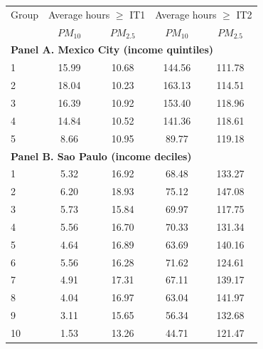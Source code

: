 \begin{tabular}{lcc|cc}
    \toprule
    \toprule
    Group & \multicolumn{2}{c|}{Average hours $\geq$ IT1} & \multicolumn{2}{c}{Average hours $\geq$ IT2} \\
    & $PM_{10}$ & $PM_{2.5}$ & $PM_{10}$ & $PM_{2.5}$ \\
    \midrule
    \multicolumn{5}{l}{\textbf{Panel A. Mexico City (income quintiles)}} \\
    \midrule
    1 & 15.99 & 10.68 & 144.56 & 111.78 \\
    2 & 18.04 & 10.23 & 163.13 & 114.51 \\
    3 & 16.39 & 10.92 & 153.40 & 118.96 \\
    4 & 14.84 & 10.52 & 141.36 & 118.61 \\
    5 & 8.66 & 10.95 & 89.77 & 119.18 \\
    \midrule
    \multicolumn{5}{l}{\textbf{Panel B. Sao Paulo (income deciles)}} \\
    \midrule
    1 & 5.32 & 16.92 & 68.48 & 133.27 \\
    2 & 6.20 & 18.93 & 75.12 & 147.08 \\
    3 & 5.73 & 15.84 & 69.97 & 117.75 \\
    4 & 5.56 & 16.70 & 70.33 & 131.34 \\
    5 & 4.64 & 16.89 & 63.69 & 140.16 \\
    6 & 5.56 & 16.28 & 71.62 & 124.61 \\
    7 & 4.91 & 17.31 & 67.11 & 139.17 \\
    8 & 4.04 & 16.97 & 63.04 & 141.97 \\
    9 & 3.11 & 15.65 & 56.34 & 132.68 \\
    10 & 1.53 & 13.26 & 44.71 & 121.47 \\
    \bottomrule
    \bottomrule
\end{tabular}
